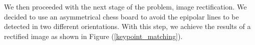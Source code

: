 \documentclass[12pt,letterpaper]{article}
\begin{document}

We then proceeded with the next stage of the problem, image rectification. We decided to use an asymmetrical chess board to avoid the epipolar lines to be detected in two different orientations. With this step, we achieve the results of a rectified image as shown in Figure (\ref{keypoint_matching}). 
\end{document}
